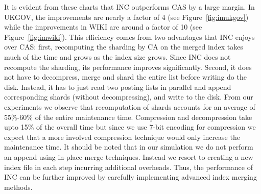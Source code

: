 It is evident from these charts that INC outperforms CAS by a large margin. In UKGOV, the improvements are nearly a factor of 4 (see Figure~\ref{fig:imukgov}) while the improvements in WIKI are around a factor of 10 (see Figure~\ref{fig:imwiki}).  This efficiency comes from two advantages that INC
enjoys over CAS: first, recomputing the sharding by CA on the merged
index takes much of the time and grows as the index size grows. Since
INC does not recompute the sharding, its performance improves
significantly. Second, it does not have to decompress, merge and shard
the entire list before writing do the disk. Instead, it has to just
read two posting lists in parallel and append corresponding shards
(without decompressing), and write to the disk. From our experiments we observe that recomputation of shards accounts for an average of 55\%-60\% of the entire maintenance time. Compression and decompression take upto 15\% of the overall time but since we use 7-bit encoding for compression we expect that a more involved compression technique would only increase the maintenance time. It should be noted
that in our simulation we do not perform an append using in-place merge techniques. Instead we resort
to creating a new index file in each step incurring additional
overheads. Thus, the performance of INC can be further improved by
carefully implementing advanced index merging methods.




